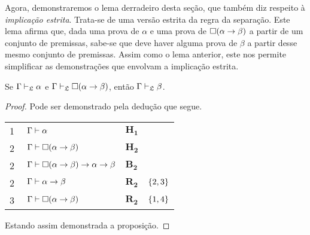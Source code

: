     \vspace{.5\baselineskip}
    Agora, demonstraremos o lema derradeiro desta seção, que também diz respeito à \emph{implicação estrita}.
    Trata-se de uma versão estrita da regra da separação.
    Este lema afirma que, dada uma prova de $\alpha$ e uma prova de $\Box(\alpha\to\beta)$ a partir de um conjunto de premissas, sabe-se que deve haver alguma prova de $\beta$ a partir desse mesmo conjunto de premissas.
    Assim como o lema anterior, este nos permite simplificar as demonstrações que envolvam a implicação estrita.

    \vspace{\baselineskip}
    \begin{tcolorbox}[enhanced jigsaw, breakable, sharp corners, colframe=black, colback=white, boxrule=0.5pt, left=1.5mm, right=1.5mm, top=1.5mm, bottom=1.5mm]
    \begin{lemma}\label{strict.detachment}
        Se $\Gamma\mathrel{\vdash}_{\mathfrak{L}}\alpha$ e $\Gamma\mathrel{\vdash}_{\mathfrak{L}}\Box(\alpha\to\beta)$, então $\Gamma\mathrel{\vdash}_{\mathfrak{L}}\beta$.
        \begin{proof}
            Pode ser demonstrado pela dedução que segue.

            \vspace{0.5\baselineskip}
            \footnotesize
            \setlength{\rowskip}{0.5\baselineskip}
            \begin{xltabular}{\textwidth}{r | X l l}
                \scriptsize{\phantom{0}1}\phantom{ } & $\ \Gamma\entails\alpha$                                & $\mathbf{H_1}$\phantom{1}                      & \\[\rowskip]
                \scriptsize{\phantom{0}2}\phantom{ } & $\ \Gamma\entails\nec(\alpha\to\beta)$                  & $\mathbf{H_2}$                                 & \\[\rowskip]
                \scriptsize{\phantom{0}2}\phantom{ } & $\ \Gamma\entails\nec(\alpha\to\beta)\to\alpha\to\beta$ & $\hyperref[modal.axiom.modal.2]{\mathbf{B_2}}$ & \\[\rowskip]
                \scriptsize{\phantom{0}2}\phantom{ } & $\ \Gamma\entails\alpha\to\beta$                        & $\hyperref[modal.rule.2]{\mathbf{R_2}}$        & $\left\{2,3\right\}$\\[\rowskip]
                \scriptsize{\phantom{0}3}\phantom{ } & $\ \Gamma\entails\nec(\alpha\to\beta)$                  & $\hyperref[modal.rule.2]{\mathbf{R_2}}$        & $\left\{1,4\right\}$
            \end{xltabular}
            \normalsize

            \vspace{0.5\baselineskip}
            Estando assim demonstrada a proposição.
        \end{proof}
    \end{lemma}
    \end{tcolorbox}

